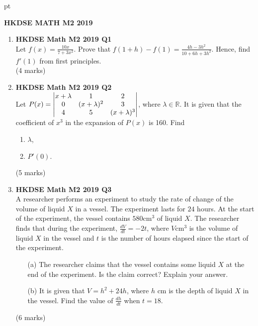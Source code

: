 \documentclass[12pt]{article}
\begin{document}
 pt
\begin{center}
	{\large \bf HKDSE MATH M2 2019}\\
	\vspace{2 mm}

\end{center}
\vspace{0.05cm}

\begin{enumerate}
	\item \textbf{HKDSE Math M2 2019 Q1}\\
	Let $\displaystyle f(x) = \frac{10x}{7+3x^2}$. Prove that $f(1+h) - f(1) = \displaystyle\frac{4h-3h^2}{10+6h+3h^2}$. Hence, find  $f'(1)$ from first principles. \\(4 marks)


	\item \textbf{HKDSE Math M2 2019 Q2}\\
	Let $P(x) = \begin{vmatrix}
		x+\lambda & 1 & 2  \\ 
		0 & (x+\lambda)^2 & 3 \\ 
		4 & 5 & (x+\lambda)^3  \notag
		\end{vmatrix}$, where $\lambda \in \mathbb{R}$. It is given that the coefficient of $x^3$ in the expansion of $P(x)$ is 160. Find
	\begin{enumerate}
		\item $\lambda$,
		\item $P'(0)$. 
	\end{enumerate}
	(5 marks)




	\item \textbf{HKDSE Math M2 2019 Q3}\\
	A researcher performs an experiment to study the rate of change of the volume of liquid $X$ in a vessel. The experiment lasts for $24$ hours. At the start  of the experiment, the vessel contains $580 $cm$^3$ of liquid $X$. The researcher finds that during the experiment, $\displaystyle\frac{dV}{dt} = -2t$, where $V $cm$^3$ is the volume of liquid $X$ in the vessel and $t$ is the number of hours elapsed since the start of the experiment.
	\begin{enumerate}
		\item [(a)] The researcher claims that the vessel contains some liquid $X$ at the end of the experiment. Is the claim correct? Explain your answer.
		\item [(b)] It is given that $V = h^2+24h$, where $h $ cm is the depth of liquid $X$ in the vessel. Find the value of $\displaystyle\frac{dh}{dt}$ when $t = 18$.
	\end{enumerate}
	(6 marks)


\end{enumerate}
\end{document}
